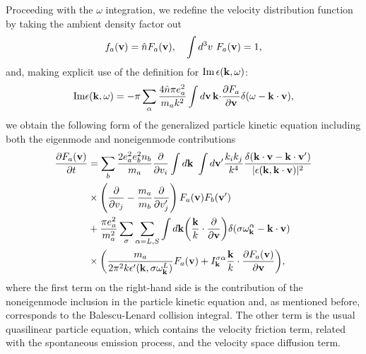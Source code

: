 \documentclass[12pt,a4paper,ruledheader]{report}
\begin{document}
Proceeding with the $\omega$ integration, we redefine the velocity
distribution function by taking the ambient density factor out
\begin{equation}
  \label{Fa}
f_a({\bf v})= \hat n F_a({\bf v}), \quad \int d^3v\ F_a({\bf v})=1,
\end{equation}
and, making explicit use of the definition for
$\mbox{Im}\,\epsilon({\bf k},\omega)$:
\begin{displaymath}
  \mbox{Im}\epsilon({\bf k},\omega)
  =-\pi \sum_\alpha \frac{4\hat n \pi e_a^2}{m_a k^2} \int d{\bf v}\,
  {\bf k \cdot}\frac{\partial F_a}{\partial {\bf v}}\delta(\omega-{\bf k\cdot v}),
\end{displaymath}
we obtain the following form of the generalized particle kinetic
equation including both the eigenmode and noneigenmode contributions
\cite{YZKS16}
\begin{equation}
\begin{split}
  \frac{\partial F_a({\bf v})}{\partial t}
  &=\sum_b\frac{2e_a^2e_b^2n_b}{m_a}\frac{\partial }{\partial v_i}
  \int d{\bf k}\ \int d{\bf v'}
  \frac{k_ik_j}{k^4}\frac{\delta({\bf k \cdot v - k \cdot v'})}
    {|\epsilon({\bf k, k\cdot v})|^2}\\
  &\times \left(\frac{\partial }{\partial v_j} -\frac{m_a}{m_b}
    \frac{\partial }{\partial v'_j}\right)
  F_a({\bf v})F_b({\bf v'})\\
  &+\frac{\pi e_a^2}{m_a^2}\sum_\sigma\sum_{\alpha=L,S}
  \int d{\bf k} \biggl(\frac{\bf k}{k}
\cdot\frac{\partial}{\partial{\bf v}}\biggr)
\delta(\sigma\omega_{\bf k}^\alpha-{\bf k}\cdot{\bf v})\\
&\times\biggl(\frac{m_a}{2\pi^2k\epsilon '({\bf k},\sigma\omega_{\bf k}^L)}
F_a({\bf v})+I_{\bf k}^{\sigma\alpha}
\frac{\bf k}{k}\cdot\frac{\partial F_a({\bf v})}{\partial{\bf v}}\biggr),
\end{split}
\label{Fa-gen}
\end{equation}
where the first term on the right-hand side is the contribution
of the noneigenmode inclusion in the particle kinetic equation
and, as mentioned before, corresponds to
the Balescu-Lenard collision integral.
The other term is the usual quasilinear particle equation, which
contains the velocity friction term, related with the spontaneous
emission process, and the velocity space diffusion term.
\end{document}
